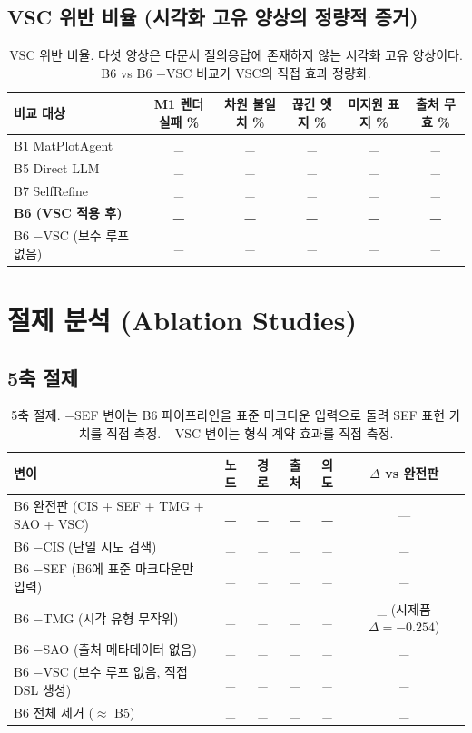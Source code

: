 \documentclass[11pt]{article}
\begin{document}
\subsection{VSC 위반 비율 (시각화 고유 양상의 정량적 증거)}

\begin{table}[h]
\centering
\small
\begin{tabular}{l|ccccc}
\toprule
비교 대상 & M1 렌더 실패 \% & 차원 불일치 \% & 끊긴 엣지 \% & 미지원 표지 \% & 출처 무효 \% \\
\midrule
B1 MatPlotAgent & \_ & \_ & \_ & \_ & \_ \\
B5 Direct LLM & \_ & \_ & \_ & \_ & \_ \\
B7 SelfRefine & \_ & \_ & \_ & \_ & \_ \\
\textbf{B6 (VSC 적용 후)} & \textbf{\_} & \textbf{\_} & \textbf{\_} & \textbf{\_} & \textbf{\_} \\
B6 −VSC (보수 루프 없음) & \_ & \_ & \_ & \_ & \_ \\
\bottomrule
\end{tabular}
\caption{VSC 위반 비율. 다섯 양상은 다문서 질의응답에 존재하지 않는 시각화 고유 양상이다. B6 vs B6 −VSC 비교가 VSC의 직접 효과 정량화.}
\label{tab:vsc}
\end{table}

\section{절제 분석 (Ablation Studies)}

\subsection{5축 절제}

\begin{table}[h]
\centering
\small
\begin{tabular}{l|cccc|c}
\toprule
변이 & 노드 & 경로 & 출처 & 의도 & $\Delta$ vs 완전판 \\
\midrule
B6 완전판 (CIS + SEF + TMG + SAO + VSC) & \textbf{\_} & \textbf{\_} & \textbf{\_} & \textbf{\_} & — \\
B6 −CIS (단일 시도 검색) & \_ & \_ & \_ & \_ & \_ \\
B6 −SEF (B6에 표준 마크다운만 입력) & \_ & \_ & \_ & \_ & \_ \\
B6 −TMG (시각 유형 무작위) & \_ & \_ & \_ & \_ & \_ (시제품 $\Delta=-0.254$) \\
B6 −SAO (출처 메타데이터 없음) & \_ & \_ & \_ & \_ & \_ \\
B6 −VSC (보수 루프 없음, 직접 DSL 생성) & \_ & \_ & \_ & \_ & \_ \\
B6 전체 제거 ($\approx$ B5) & \_ & \_ & \_ & \_ & \_ \\
\bottomrule
\end{tabular}
\caption{5축 절제. −SEF 변이는 B6 파이프라인을 표준 마크다운 입력으로 돌려 SEF 표현 가치를 직접 측정. −VSC 변이는 형식 계약 효과를 직접 측정.}
\label{tab:t7}
\end{table}
\end{document}
